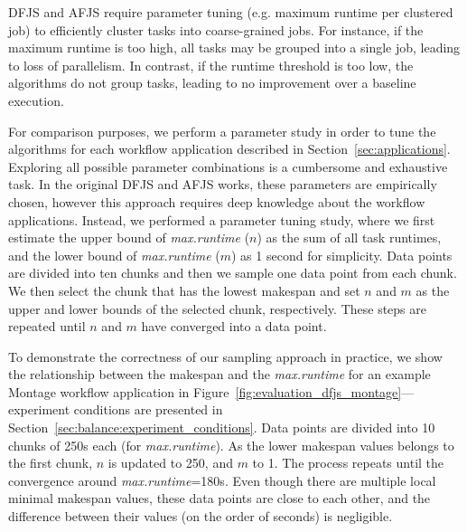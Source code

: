 DFJS and AFJS require parameter tuning (e.g. maximum runtime per clustered job) to efficiently cluster tasks into coarse-grained jobs. For instance, if the maximum runtime is too high, all tasks may be grouped into a single job, leading to loss of parallelism. In contrast, if the runtime threshold is too low, the algorithms do not group tasks, leading to no improvement over a baseline execution. 

For comparison purposes, we perform a parameter study in order to tune the algorithms for each workflow application described in Section~\ref{sec:applications}. Exploring all possible parameter combinations is a cumbersome and exhaustive task. In the original DFJS and AFJS works, these parameters are empirically chosen, however this approach requires deep knowledge about the workflow applications. Instead, we performed a parameter tuning study, where we first estimate the upper bound of \emph{max.runtime} ($n$) as the sum of all task runtimes, and the lower bound of \emph{max.runtime} ($m$) as 1 second for simplicity. Data points are divided into ten chunks and then we sample one data point from each chunk. We then select the chunk that has the lowest makespan and set $n$ and $m$ as the upper and lower bounds of the selected chunk, respectively. These steps are repeated until $n$ and $m$ have converged into a data point.


To demonstrate the correctness of our sampling approach in practice, we show the relationship between the makespan and the \emph{max.runtime} for an example Montage workflow application in Figure~\ref{fig:evaluation_dfjs_montage}---experiment conditions are presented in Section~\ref{sec:balance:experiment_conditions}. Data points are divided into 10 chunks of 250s each (for \emph{max.runtime}). As the lower makespan values belongs to the first chunk, $n$ is updated to 250, and $m$ to 1. The process repeats until the convergence around \emph{max.runtime}=180s. Even though there are multiple local minimal makespan values, these data points are close to each other, and the difference between their values (on the order of seconds) is negligible.

